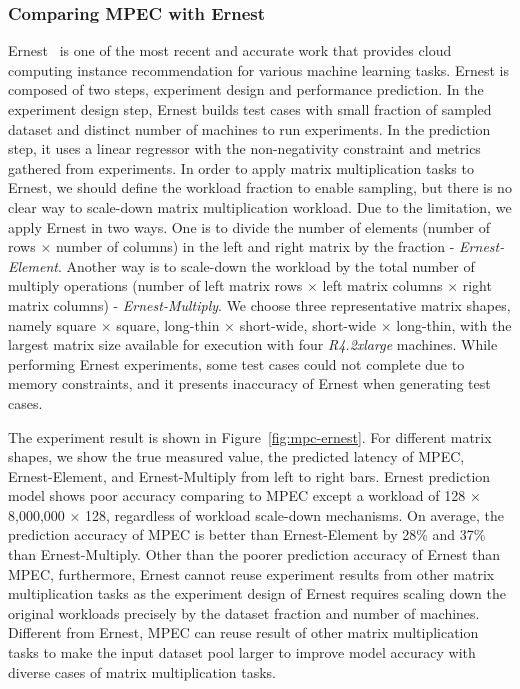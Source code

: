\documentclass[10pt, conference, compsocconf]{IEEEtran}
\begin{document}
\subsubsection{Comparing MPEC with Ernest}
Ernest~\cite{ernest} is one of the most recent and accurate work that provides cloud computing instance recommendation for various machine learning tasks. Ernest is composed of two steps, experiment design and performance prediction. In the experiment design step, Ernest builds test cases with small fraction of sampled dataset and distinct number of machines to run experiments. In the prediction step, it uses a linear regressor with the non-negativity constraint and metrics gathered from experiments. In order to apply matrix multiplication tasks to Ernest, we should define the workload fraction to enable sampling, but there is no clear way to scale-down matrix multiplication workload. Due to the limitation, we apply Ernest in two ways. One is to divide the number of elements (number of rows $\times$ number of columns) in the left and right matrix by the fraction - \textit{Ernest-Element}. Another way is to scale-down the workload by the total number of multiply operations (number of left matrix rows $\times$ left matrix columns $\times$ right matrix columns) - \textit{Ernest-Multiply}. We choose three representative matrix shapes, namely square $\times$ square, long-thin $\times$ short-wide, short-wide $\times$ long-thin, with the largest matrix size available for execution with four \textit{R4.2xlarge} machines. While performing Ernest experiments, some test cases could not complete due to memory constraints, and it presents inaccuracy of Ernest when generating test cases.

The experiment result is shown in Figure~\ref{fig:mpc-ernest}. For different matrix shapes, we show the true measured value, the predicted latency of MPEC, Ernest-Element, and Ernest-Multiply from left to right bars. Ernest prediction model shows poor accuracy comparing to MPEC except a workload of 128 $\times$ 8,000,000 $\times$ 128, regardless of workload scale-down mechanisms. On average, the prediction accuracy of MPEC is better than Ernest-Element by 28\% and 37\% than Ernest-Multiply. Other than the poorer prediction accuracy of Ernest than MPEC, furthermore, Ernest cannot reuse experiment results from other matrix multiplication tasks as the experiment design of Ernest requires scaling down the original workloads precisely by the dataset fraction and number of machines. Different from Ernest, MPEC can reuse result of other matrix multiplication tasks to make the input dataset pool larger to improve model accuracy with diverse cases of matrix multiplication tasks.
\end{document}
